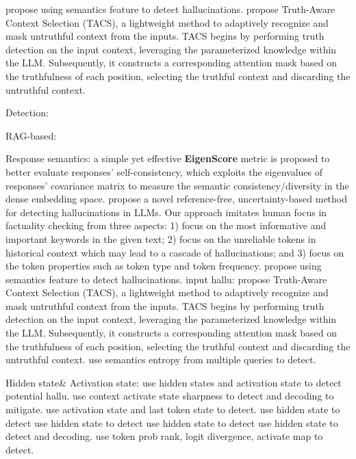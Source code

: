 \cite{sadat2023delucionqa} propose using semantics feature to detect hallucinations.
\cite{yu2024truth} propose Truth-Aware Context Selection (TACS), a lightweight method to adaptively recognize and mask untruthful context from the inputs. TACS begins by performing truth detection on the input context, leveraging the parameterized knowledge within the LLM. Subsequently, it constructs a corresponding attention mask based on the truthfulness of each position, selecting the truthful context and discarding the untruthful context.



Detection:

RAG-based:
\cite{niu2024ragtruth}
\cite{su2024mitigating}
\cite{hu2024lrp4ragdetecting}


Response semantics:
\cite{chen2024inside} a simple yet effective \textbf{EigenScore} metric is proposed to better evaluate responses' self-consistency, which exploits the eigenvalues of responses' covariance matrix to measure the semantic consistency/diversity in the dense embedding space.
\cite{zhang2023enhancing} propose a novel reference-free, uncertainty-based method for detecting hallucinations in LLMs. Our approach imitates human focus in factuality checking from three aspects: 1) focus on the most informative and important keywords in the given text; 2) focus on the unreliable tokens in historical context which may lead to a cascade of hallucinations; and 3) focus on the token properties such as token type and token frequency.
\cite{sadat2023delucionqa} propose using semantics feature to detect hallucinations.
input hallu: \cite{yu2024truth} propose Truth-Aware Context Selection (TACS), a lightweight method to adaptively recognize and mask untruthful context from the inputs. TACS begins by performing truth detection on the input context, leveraging the parameterized knowledge within the LLM. Subsequently, it constructs a corresponding attention mask based on the truthfulness of each position, selecting the truthful context and discarding the untruthful context.
\cite{kossen2024semantic} use semantics entropy from multiple queries to detect.

Hidden state\& Activation state:
\cite{beigi2024internalinspector} use hidden states and activation state to detect potential hallu.
\cite{chen2024context} use context activate state sharpness to detect and decoding to mitigate.
\cite{ji2024llm} use activation state and last token state to detect.
\cite{chen2024inside} use hidden state to detect
\cite{su2024unsupervised} use hidden state to detect
\cite{duan2024llms} use hidden state to detect
\cite{azaria2023internal} use hidden state to detect and decoding.
\cite{he2024llm} use token prob rank, logit divergence, activate map to detect.

